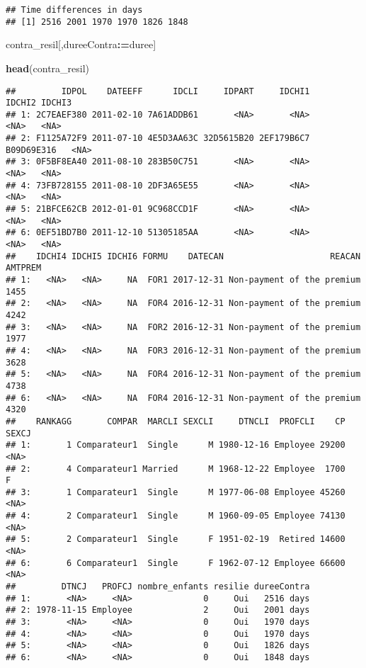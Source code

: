 \documentclass[
]{article}
\newenvironment{Shaded}{\begin{snugshade}}{\end{snugshade}}
\newcommand{\ErrorTok}[1]{\textcolor[rgb]{0.64,0.00,0.00}{\textbf{#1}}}
\newcommand{\KeywordTok}[1]{\textcolor[rgb]{0.13,0.29,0.53}{\textbf{#1}}}
\newcommand{\NormalTok}[1]{#1}
\newcommand{\OperatorTok}[1]{\textcolor[rgb]{0.81,0.36,0.00}{\textbf{#1}}}
\begin{document}
\begin{verbatim}
## Time differences in days
## [1] 2516 2001 1970 1970 1826 1848
\end{verbatim}

\begin{Shaded}
\begin{Highlighting}[]
\NormalTok{contra_resil[,dureeContra}\OperatorTok{:}\ErrorTok{=}\NormalTok{duree]}

\KeywordTok{head}\NormalTok{(contra_resil)}
\end{Highlighting}
\end{Shaded}

\begin{verbatim}
##         IDPOL    DATEEFF      IDCLI     IDPART     IDCHI1     IDCHI2 IDCHI3
## 1: 2C7EAEF380 2011-02-10 7A61ADDB61       <NA>       <NA>       <NA>   <NA>
## 2: F1125A72F9 2011-07-10 4E5D3AA63C 32D5615B20 2EF179B6C7 B09D69E316   <NA>
## 3: 0F5BF8EA40 2011-08-10 283B50C751       <NA>       <NA>       <NA>   <NA>
## 4: 73FB728155 2011-08-10 2DF3A65E55       <NA>       <NA>       <NA>   <NA>
## 5: 21BFCE62CB 2012-01-01 9C968CCD1F       <NA>       <NA>       <NA>   <NA>
## 6: 0EF51BD7B0 2011-12-10 51305185AA       <NA>       <NA>       <NA>   <NA>
##    IDCHI4 IDCHI5 IDCHI6 FORMU    DATECAN                     REACAN AMTPREM
## 1:   <NA>   <NA>     NA  FOR1 2017-12-31 Non-payment of the premium    1455
## 2:   <NA>   <NA>     NA  FOR4 2016-12-31 Non-payment of the premium    4242
## 3:   <NA>   <NA>     NA  FOR2 2016-12-31 Non-payment of the premium    1977
## 4:   <NA>   <NA>     NA  FOR3 2016-12-31 Non-payment of the premium    3628
## 5:   <NA>   <NA>     NA  FOR4 2016-12-31 Non-payment of the premium    4738
## 6:   <NA>   <NA>     NA  FOR4 2016-12-31 Non-payment of the premium    4320
##    RANKAGG       COMPAR  MARCLI SEXCLI     DTNCLI  PROFCLI    CP SEXCJ
## 1:       1 Comparateur1  Single      M 1980-12-16 Employee 29200  <NA>
## 2:       4 Comparateur1 Married      M 1968-12-22 Employee  1700     F
## 3:       1 Comparateur1  Single      M 1977-06-08 Employee 45260  <NA>
## 4:       2 Comparateur1  Single      M 1960-09-05 Employee 74130  <NA>
## 5:       2 Comparateur1  Single      F 1951-02-19  Retired 14600  <NA>
## 6:       6 Comparateur1  Single      F 1962-07-12 Employee 66600  <NA>
##         DTNCJ   PROFCJ nombre_enfants resilie dureeContra
## 1:       <NA>     <NA>              0     Oui   2516 days
## 2: 1978-11-15 Employee              2     Oui   2001 days
## 3:       <NA>     <NA>              0     Oui   1970 days
## 4:       <NA>     <NA>              0     Oui   1970 days
## 5:       <NA>     <NA>              0     Oui   1826 days
## 6:       <NA>     <NA>              0     Oui   1848 days
\end{verbatim}
\end{document}
